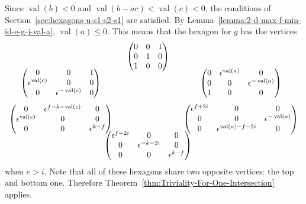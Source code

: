 \documentclass{amsart}
\theoremstyle{definition}
\def\e{\epsilon}
\def\val{\mathop{\mathrm{val}}}
\def\heximagessqueezedcarefully#1#2#3#4#5#6#7#8{
  \begin{array}{ccc}
    & #3 & \\[#2]
    #5 \hspace{-#1} & & \hspace{-#1} #4 \\[2em]
    #6 \hspace{-#1} & & \hspace{-#1} #7 \\[#2]
    & #8 &
  \end{array}
}
\begin{document}
  Since $\val(b) < 0$ and $\val(b-ac) < \val(c) < 0$, the conditions of
  Section~\ref{sec:hexagons-u-s1-s2-s1} are satisfied.  By
  Lemma~\ref{lemma:2-d-max-f-min-id-e-g-j-val-a}, $\val(a) \le 0$.  This means
  that the hexagon for $g$ has the vertices
  \begin{equation*}
    \heximagessqueezedcarefully{2.0em}{-0.4em}
       {\begin{pmatrix}
           0 & 0 & 1 \\
           0 & 1 & 0 \\
           1 & 0 & 0 
       \end{pmatrix}}
       {\begin{pmatrix}
           0 & \e^{\val(a)} & 0 \\
           0 & 0 & \e^{-\val(a)}  \\
           1 & 0 & 0
       \end{pmatrix}}
       {\begin{pmatrix}
           0 & 0 & 1 \\
           \e^{\val(c)}  & 0 & 0 \\
           0 & \e^{-\val(c)}  & 0
       \end{pmatrix}}
       {\begin{pmatrix}
           0 & \e^{f-k - \val(c)} & 0 \\
           \e^{\val(c)} & 0 & 0 \\
           0 & 0 & \e^{k-f} 
       \end{pmatrix}}
       {\begin{pmatrix}
           \e^{f+2i}  & 0 & 0 \\
           0 & 0 & \e^{-\val(a)} \\
           0 & \e^{\val(a) - f - 2i} & 0  
       \end{pmatrix}}
       {\begin{pmatrix}
           \e^{f+2i} & 0 & 0 \\
           0 & \e^{-k-2i} & 0 \\
           0 & 0 & \e^{k-f} 
       \end{pmatrix}}
  \end{equation*}
  when $e > i$.  Note that all of these hexagons share two opposite vertices:
  the top and bottom one.  Therefore
  Theorem~\ref{thm:Triviality-For-One-Intersection} applies.
\end{document}
